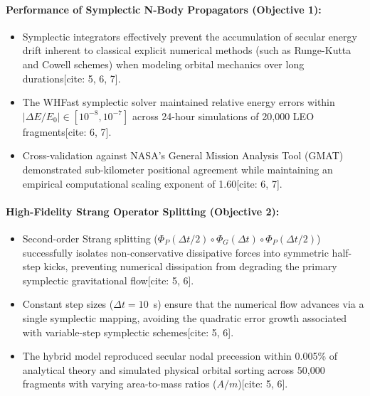 \documentclass[12pt,letterpaper,twoside]{book}
\begin{document}
\paragraph{Performance of Symplectic N-Body Propagators (Objective 1):}
\begin{itemize}
    \item Symplectic integrators effectively prevent the accumulation of secular energy drift inherent to classical explicit numerical methods (such as Runge-Kutta and Cowell schemes) when modeling orbital mechanics over long durations[cite: 5, 6, 7].
    \item The WHFast symplectic solver maintained relative energy errors within $\vert{}\Delta E/E_0\vert{} \in [10^{-8}, 10^{-7}]$ across 24-hour simulations of 20,000 LEO fragments[cite: 6, 7].
    \item Cross-validation against NASA's General Mission Analysis Tool (GMAT) demonstrated sub-kilometer positional agreement while maintaining an empirical computational scaling exponent of 1.60[cite: 6, 7].
\end{itemize}

\paragraph{High-Fidelity Strang Operator Splitting (Objective 2):}
\begin{itemize}
    \item Second-order Strang splitting ($\Phi_P(\Delta t/2) \circ \Phi_G(\Delta t) \circ \Phi_P(\Delta t/2)$) successfully isolates non-conservative dissipative forces into symmetric half-step kicks, preventing numerical dissipation from degrading the primary symplectic gravitational flow[cite: 5, 6].
    \item Constant step sizes ($\Delta t = 10$~s) ensure that the numerical flow advances via a single symplectic mapping, avoiding the quadratic error growth associated with variable-step symplectic schemes[cite: 5, 6].
    \item The hybrid model reproduced secular nodal precession within 0.005\% of analytical theory and simulated physical orbital sorting across 50,000 fragments with varying area-to-mass ratios ($A/m$)[cite: 5, 6].
\end{itemize}
\end{document}
